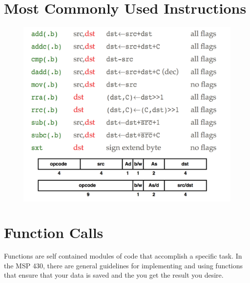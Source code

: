 \documentclass{hw}
\begin{document}
\section{Most Commonly Used Instructions}
\begin{figure}[H]
  \includegraphics[scale=.6]{img/instructions}
\end{figure}


\section{Function Calls}
Functions are self contained modules of code that accomplish a specific task. 
In the MSP 430, there are general guidelines for implementing and using functions
that ensure that your data is saved and the you get the result you desire. 
\end{document}
